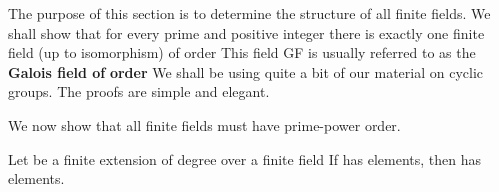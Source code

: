 \documentclass[11pt,oneside]{article}
\begin{document}
\fi
\renewcommand{\BookFooter}{Section 42 Finite Fields}
\ifdefined\BookMaster\else\setcounter{page}{335}\fi
\BookNarrativetrue

\begin{BookBody}


\noindent The purpose of this section is to determine the structure of all finite fields. We shall show that for every prime  and positive integer  there is exactly one finite field (up to isomorphism) of order  This field GF is usually referred to as the\textbf{ Galois field of} \textbf{order}  We shall be using quite a bit of our material on cyclic groups. The proofs are simple and elegant.


\noindent We now show that all finite fields must have prime-power order.

 Let  be a finite extension of degree  over a finite field  If  has  elements, then  has  elements.

\end{BookBody}

\BookNarrativetrue
\end{document}
